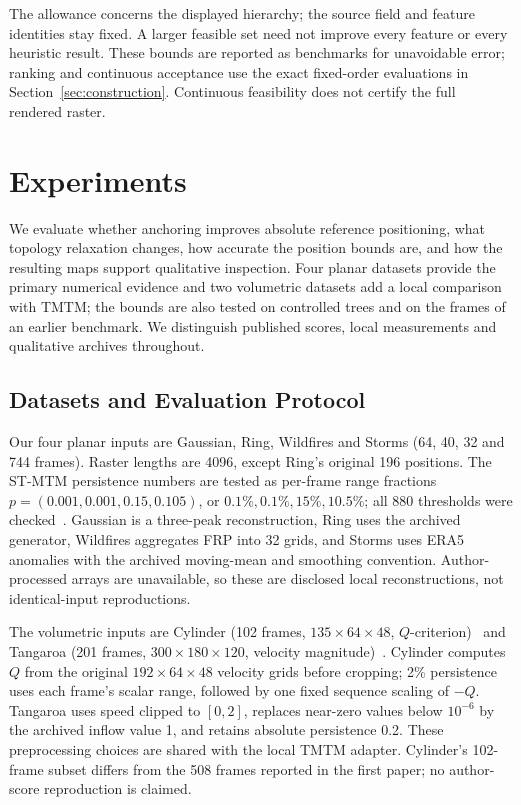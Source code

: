 \documentclass{vgtc}                %
\begin{document}
The allowance concerns the displayed hierarchy; the source field and feature identities stay fixed. A larger feasible set need not improve every feature or every heuristic result. These bounds are reported as benchmarks for unavoidable error; ranking and continuous acceptance use the exact fixed-order evaluations in Section~\ref{sec:construction}. Continuous feasibility does not certify the full rendered raster.

\section{Experiments}\label{sec:experiments}
We evaluate whether anchoring improves absolute reference positioning, what topology relaxation changes, how accurate the position bounds are, and how the resulting maps support qualitative inspection. Four planar datasets provide the primary numerical evidence and two volumetric datasets add a local comparison with TMTM; the bounds are also tested on controlled trees and on the frames of an earlier benchmark. We distinguish published scores, local measurements and qualitative archives throughout.

\subsection{Datasets and Evaluation Protocol}
Our four planar inputs are Gaussian, Ring, Wildfires and Storms (64, 40, 32 and 744 frames). Raster lengths are 4096, except Ring's original 196 positions. The ST-MTM persistence numbers are tested as per-frame range fractions $p=(0.001,0.001,0.15,0.105)$, or $0.1\%,0.1\%,15\%,10.5\%$; all 880 thresholds were checked~\cite{STMTM:2026}. Gaussian is a three-peak reconstruction, Ring uses the archived generator, Wildfires aggregates FRP into 32 grids, and Storms uses ERA5 anomalies with the archived moving-mean and smoothing convention. Author-processed arrays are unavailable, so these are disclosed local reconstructions, not identical-input reproductions.

The volumetric inputs are Cylinder (102 frames, $135\times64\times48$, $Q$-criterion)~\cite{Camarri:2005:Cylinder,Weinkauf:SquareCylinder} and Tangaroa (201 frames, $300\times180\times120$, velocity magnitude)~\cite{Popinet:2004:Tangaroa}. Cylinder computes $Q$ from the original $192\times64\times48$ velocity grids before cropping; 2\% persistence uses each frame's scalar range, followed by one fixed sequence scaling of $-Q$. Tangaroa uses speed clipped to $[0,2]$, replaces near-zero values below $10^{-6}$ by the archived inflow value 1, and retains absolute persistence 0.2. These preprocessing choices are shared with the local TMTM adapter. Cylinder's 102-frame subset differs from the 508 frames reported in the first paper; no author-score reproduction is claimed.
\end{document}
